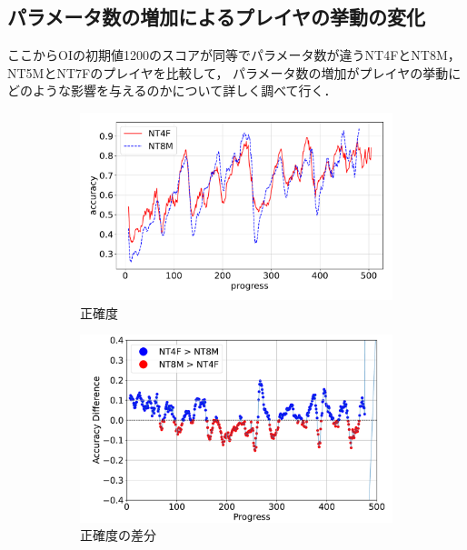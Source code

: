 \subsection{パラメータ数の増加によるプレイヤの挙動の変化}
ここからOIの初期値1200のスコアが同等でパラメータ数が違うNT4FとNT8M，NT5MとNT7Fのプレイヤを比較して，
パラメータ数の増加がプレイヤの挙動にどのような影響を与えるのかについて詳しく調べて行く．
\begin{figure}[t]
\centering
\begin{subfigure}[b]{0.49\linewidth}
    \includegraphics[width=\linewidth]{pdf/compare/NT4F_and_NT8M/accuracy.pdf}
    \caption{正確度}
    \label{fig:NT4F_and_NT8M_accuracy}
\end{subfigure}
\begin{subfigure}[b]{0.49\linewidth}
    \includegraphics[width=\linewidth]{pdf/compare/NT4F_and_NT8M/acc_diff_plot.pdf}
    \caption{正確度の差分}
    \label{fig:NT4F_and_NT8M_acc_diff}
\end{subfigure}
\begin{subfigure}[b]{0.49\linewidth}

\end{subfigure}
\end{figure}
